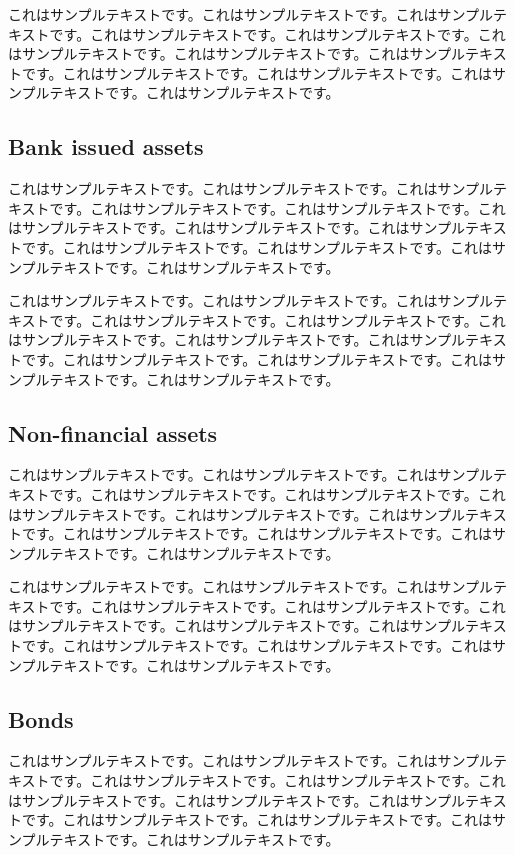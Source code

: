 \documentclass[a4paper, dvipdfmx]{jsarticle}
\begin{document}
これはサンプルテキストです。これはサンプルテキストです。これはサンプルテキストです。これはサンプルテキストです。これはサンプルテキストです。これはサンプルテキストです。これはサンプルテキストです。これはサンプルテキストです。これはサンプルテキストです。これはサンプルテキストです。これはサンプルテキストです。これはサンプルテキストです。

\subsection{Bank issued assets}
これはサンプルテキストです。これはサンプルテキストです。これはサンプルテキストです。これはサンプルテキストです。これはサンプルテキストです。これはサンプルテキストです。これはサンプルテキストです。これはサンプルテキストです。これはサンプルテキストです。これはサンプルテキストです。これはサンプルテキストです。これはサンプルテキストです。

これはサンプルテキストです。これはサンプルテキストです。これはサンプルテキストです。これはサンプルテキストです。これはサンプルテキストです。これはサンプルテキストです。これはサンプルテキストです。これはサンプルテキストです。これはサンプルテキストです。これはサンプルテキストです。これはサンプルテキストです。これはサンプルテキストです。

\subsection{Non-financial assets}
これはサンプルテキストです。これはサンプルテキストです。これはサンプルテキストです。これはサンプルテキストです。これはサンプルテキストです。これはサンプルテキストです。これはサンプルテキストです。これはサンプルテキストです。これはサンプルテキストです。これはサンプルテキストです。これはサンプルテキストです。これはサンプルテキストです。

これはサンプルテキストです。これはサンプルテキストです。これはサンプルテキストです。これはサンプルテキストです。これはサンプルテキストです。これはサンプルテキストです。これはサンプルテキストです。これはサンプルテキストです。これはサンプルテキストです。これはサンプルテキストです。これはサンプルテキストです。これはサンプルテキストです。

\subsection{Bonds}
これはサンプルテキストです。これはサンプルテキストです。これはサンプルテキストです。これはサンプルテキストです。これはサンプルテキストです。これはサンプルテキストです。これはサンプルテキストです。これはサンプルテキストです。これはサンプルテキストです。これはサンプルテキストです。これはサンプルテキストです。これはサンプルテキストです。
\end{document}
